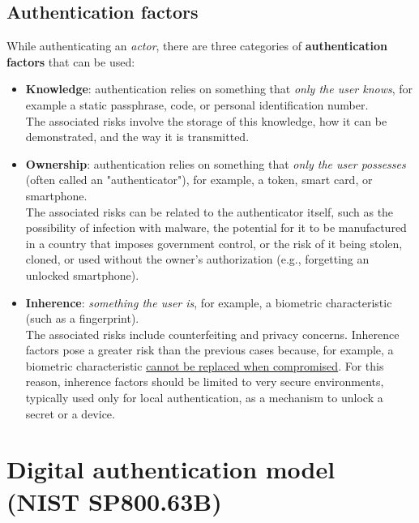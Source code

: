 \subsection{Authentication factors}
While authenticating an \emph{actor}, there are three categories of \textbf{authentication factors} that can be used:
\begin{itemize}
	\item \textbf{Knowledge}: authentication relies on something that \emph{only the user knows}, for example a static
	      passphrase, code, or personal identification number.\\
	      The associated risks involve the storage of this
	      knowledge, how it can be demonstrated, and the way it is transmitted.
	\item \textbf{Ownership}: authentication relies on something that \emph{only the user possesses} (often called an
	      "authenticator"), for example, a token, smart card, or smartphone.\\
	      The associated risks can be related
	      to the authenticator itself, such as the possibility of infection with malware, the potential for it to be
	      manufactured in a country that imposes government control, or the risk of it being stolen, cloned, or
	      used without the owner's authorization (e.g., forgetting an unlocked smartphone).
	\item \textbf{Inherence}: \emph{something the user is}, for example, a biometric characteristic (such as a fingerprint).\\
	      The associated risks include counterfeiting and privacy concerns. Inherence factors pose a greater risk
	      than the previous cases because, for example, a biometric characteristic \ul{cannot be
		      replaced when compromised}. For this reason, inherence factors should be limited to very secure environments,
	      typically used only for local authentication, as a mechanism to unlock a secret or a device.
\end{itemize}


\section{Digital authentication model (NIST SP800.63B)}\label{chap:digital-auth-model}


